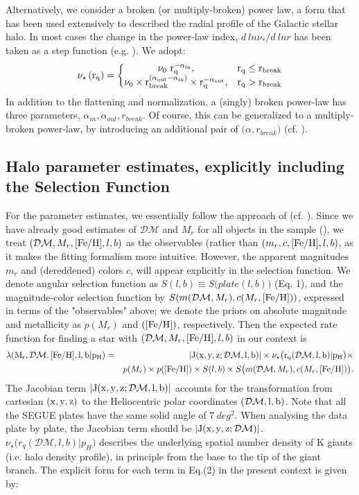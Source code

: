 \documentclass[12pt,preprint]{aastex}
\newcommand{\DM}{\mathcal{DM}}
\newcommand{\feh}{{\rm [Fe/H]}}
\begin{document}
Alternatively, we consider a broken (or multiply-broken) power law, a form that has been used extensively to described the radial profile of the Galactic stellar halo\citep{Saha1985,Sesar2011,Deason2011,Deason2014}. In most cases the change in the power-law index, 
$d~ln\nu_*/d~ln r$ has been taken as a step function (e.g. \citet{Deason2011}). We adopt:
\begin{equation}
\rm \nu_\star\left(r_q \right )= \left\{\begin{matrix} \rm \nu_0~r_q^{-\alpha_{in}}, & \rm r_q\leq r_{break} \\ \rm \nu_0\times r_{break}^{(\alpha_{out}-\alpha_{in})}\times r_q^{-\alpha_{out}},&\rm r_q>r_{break} \end{matrix}\right.
\end{equation}
In addition to the flattening and normalization, a (singly) broken power-law has three parameters,
$\alpha_{in}, \alpha_{out}, r_{break}$. Of course, this can be generalized to a multiply-broken
power-law, by introducing an additional pair of $\bigl ( \alpha, r_{break} \bigr )$ (cf. \citet{Deason2014}).

\subsection{Halo parameter estimates, explicitly including the Selection Function}\label{sec:ParameterEstimates}

For the parameter estimates, we essentially follow the approach of \citet{Bovy2012} (cf.  \citet{Rix2013}). 
Since we have already good estimates of $\DM$ and $M_r$ for all objects in the sample (\citet{Xue2014}), we treat $(\DM,M_r,\feh,l,b)$ as the observables (rather than $(m_r,c,\feh,l,b)$, as it makes the fitting formalism more intuitive. However, the apparent magnitudes $m_r$ and (dereddened) colors $c$, will appear explicitly in the selection function.  We denote angular selection function as $S(l,b)\equiv S\bigl ( plate (l,b)\bigr )$ (Eq. 1), and the magnitude-color selection function by $S(m(\DM,M_r),c(M_r,\feh))$, expressed in terms of the "observables" above; we denote the priors on absolute magnitude and metallicity as
$p(M_r)$ and $(\feh)$, respectively. Then the expected rate function for finding a star with 
$(\DM,M_r,\feh,l,b)$ in our context is
\begin{eqnarray}
\rm \lambda(M_r,\DM,\feh,l,b|p_H)&=&\rm |J(x,y,z;\DM,l,b)|\times \nu_\star\bigl (r_q(\DM,l,b)|p_H\bigr )\times \\
&&p(M_r)\times p(\feh) \times S(l,b) \times S\bigl ( m(\DM,M_r),c(M_r,\feh)\bigr )\nonumber.
\end{eqnarray}
The Jacobian term $\rm |J(x,y,z;\DM,l,b)|$ accounts for the transformation from cartesian $\rm (x,y,z)$ to the Heliocentric polar coordinates $\rm (\DM, l, b)$. Note that all the SEGUE plates have the same solid angle of $7~deg^2$. When analysing the data plate by plate, the Jacobian term should be $\rm |J(x,y,z;\DM)|$. $\nu_\star\bigl (r_q(\DM,l,b)|p_H\bigr )$ describes the underlying spatial number density of K giants (i.e. halo density profile), in principle from the base to the tip of the giant branch.
 The explicit form for each term in Eq.(2) in the present context is given by:
 
\end{document}
